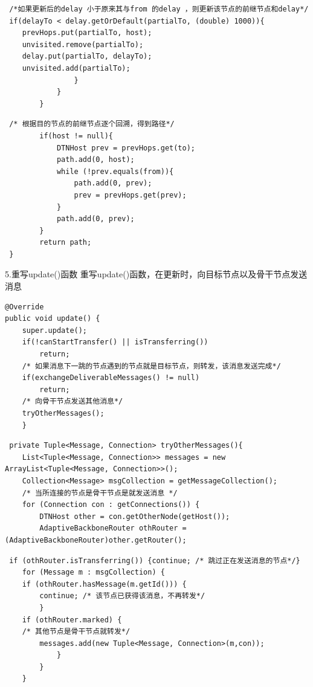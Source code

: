 \documentclass[12pt,aspectratio=43,table]{beamer}
\begin{document}
\begin{frame}[fragile]
\begin{lstlisting}
 /*如果更新后的delay 小于原来其与from 的delay ，则更新该节点的前继节点和delay*/
 if(delayTo < delay.getOrDefault(partialTo, (double) 1000)){
    prevHops.put(partialTo, host);
    unvisited.remove(partialTo);
    delay.put(partialTo, delayTo);
    unvisited.add(partialTo);
                }
            }
        }
\end{lstlisting}
\end{frame}

\begin{frame}[fragile]
\begin{lstlisting}
 /* 根据目的节点的前继节点逐个回溯，得到路径*/
        if(host != null){
            DTNHost prev = prevHops.get(to);
            path.add(0, host);
            while (!prev.equals(from)){
                path.add(0, prev);
                prev = prevHops.get(prev);
            }
            path.add(0, prev);
        }
        return path;
 }
\end{lstlisting}
\end{frame}

\begin{frame}[fragile]{\small5.重写update()函数}
重写update()函数，在更新时，向目标节点以及骨干节点发送消息
\begin{lstlisting}
@Override
public void update() {
    super.update();
    if(!canStartTransfer() || isTransferring())
        return;
    /* 如果消息下一跳的节点遇到的节点就是目标节点，则转发，该消息发送完成*/
    if(exchangeDeliverableMessages() != null)
        return;
    /* 向骨干节点发送其他消息*/
    tryOtherMessages();
    }
\end{lstlisting}
\end{frame}

\begin{frame}[fragile]
\begin{lstlisting}
 private Tuple<Message, Connection> tryOtherMessages(){
    List<Tuple<Message, Connection>> messages = new ArrayList<Tuple<Message, Connection>>();
    Collection<Message> msgCollection = getMessageCollection();
	/* 当所连接的节点是骨干节点是就发送消息 */
    for (Connection con : getConnections()) {
        DTNHost other = con.getOtherNode(getHost());
        AdaptiveBackboneRouter othRouter = (AdaptiveBackboneRouter)other.getRouter();
\end{lstlisting}
\end{frame}

\begin{frame}[fragile]
\begin{lstlisting}
 if (othRouter.isTransferring()) {continue; /* 跳过正在发送消息的节点*/}
    for (Message m : msgCollection) {
    if (othRouter.hasMessage(m.getId())) {
        continue; /* 该节点已获得该消息，不再转发*/
        }
    if (othRouter.marked) {
    /* 其他节点是骨干节点就转发*/
        messages.add(new Tuple<Message, Connection>(m,con));
            }
        }
    }
\end{lstlisting}
\end{frame}
\end{document}
